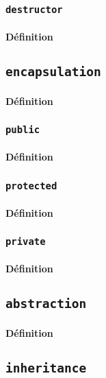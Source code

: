 \documentclass{article}
\begin{document}
\subsubsection{\texttt{destructor}}
\paragraph{Définition}

\subsection{\texttt{encapsulation}}
\paragraph{Définition}

\subsubsection{\texttt{public}}
\paragraph{Définition}

\subsubsection{\texttt{protected}}
\paragraph{Définition}

\subsubsection{\texttt{private}}
\paragraph{Définition}

\subsection{\texttt{abstraction}}
\paragraph{Définition}

\subsection{\texttt{inheritance}}
\end{document}
